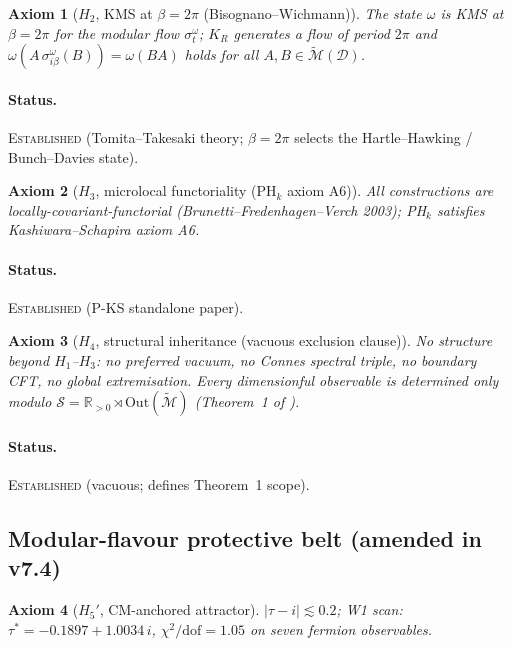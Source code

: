 \documentclass[a4paper,11pt]{article}
\newtheorem*{axiom*}{Axiom}
\theoremstyle{definition}
\theoremstyle{remark}
\begin{document}
\begin{axiom*}[$H_2$, KMS at $\beta=2\pi$ (Bisognano--Wichmann)]
The state $\omega$ is KMS at $\beta=2\pi$ for the modular flow
$\sigma^\omega_t$; $K_R$ generates a flow of period $2\pi$ and
$\omega(A\,\sigma^\omega_{i\beta}(B))=\omega(BA)$ holds for all
$A,B\in\widetilde{\mathcal{M}}(\mathcal{D})$.
\end{axiom*}

\paragraph{Status.}  \textsc{Established} (Tomita--Takesaki theory;
$\beta=2\pi$ selects the Hartle--Hawking / Bunch--Davies state).

\begin{axiom*}[$H_3$, microlocal functoriality (PH$_k$ axiom A6)]
All constructions are locally-covariant-functorial
(Brunetti--Fredenhagen--Verch 2003); PH$_k$ satisfies
Kashiwara--Schapira axiom A6.
\end{axiom*}

\paragraph{Status.}  \textsc{Established} (P-KS standalone paper).

\begin{axiom*}[$H_4$, structural inheritance (vacuous exclusion clause)]
No structure beyond $H_1$--$H_3$: no preferred vacuum, no Connes
spectral triple, no boundary CFT, no global extremisation.
Every dimensionful observable is determined only modulo
$\mathcal{S}=\mathbb{R}_{>0}\rtimes\mathrm{Out}
(\widetilde{\mathcal{M}})$ (Theorem~1 of \cite{ECIv6053}).
\end{axiom*}

\paragraph{Status.}  \textsc{Established} (vacuous; defines Theorem~1 scope).

\subsection{Modular-flavour protective belt (amended in v7.4)}
\label{sec:axioms-flavour-v75}

\begin{axiom*}[$H_5'$, CM-anchored attractor]
$|\tau-i|\lesssim 0.2$; W1 scan: $\tau^{*}=-0.1897+1.0034\,i$,
$\chi^2/\mathrm{dof}=1.05$ on seven fermion observables.
\end{axiom*}
\end{document}
